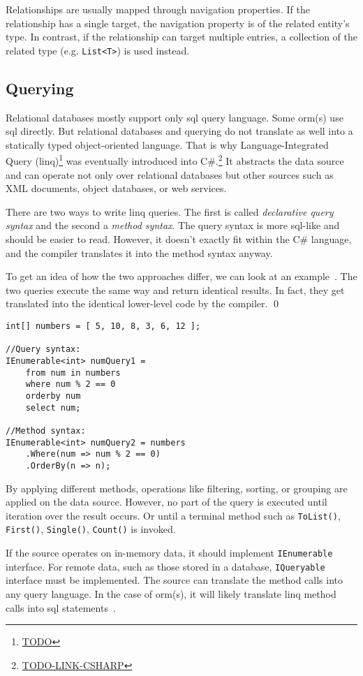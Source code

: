 Relationships are usually mapped through navigation properties. If the relationship has a single target, the navigation property is of the related entity's type. In contrast, if the relationship can target multiple entries, a collection of the related type (e.g. \texttt{List<T>}) is used instead.

\subsection{Querying}\label{sec:queries}
Relational databases mostly support only \acrshort{sql} query language. Some \acrshort{orm}(s) use \acrshort{sql} directly. But relational databases and querying do not translate as well into a statically typed object-oriented language. That is why Language-Integrated Query (\acrshort{linq})\footnote{\url{TODO}} was eventually introduced into C\#.\footnote{\url{TODO-LINK-CSHARP}} It abstracts the data source and can operate not only over relational databases but other sources such as XML documents, object databases, or web services.%

There are two ways to write \acrshort{linq} queries. The first is called \textit{declarative query syntax} and the second a \textit{method syntax}. The query syntax is more \acrshort{sql}-like and should be easier to read. However, it doesn't exactly fit within the C\# language, and the compiler translates it into the method syntax anyway.

\begin{example}
\small
To get an idea of how the two approaches differ, we can look at an example~\cite{linqQueries}. The two queries execute the same way and return identical results. In fact, they get translated into the identical lower-level code by the compiler.
\qed

\begin{lstlisting}[language=CSharp]
int[] numbers = [ 5, 10, 8, 3, 6, 12 ];

//Query syntax:
IEnumerable<int> numQuery1 =
    from num in numbers
    where num % 2 == 0
    orderby num
    select num;

//Method syntax:
IEnumerable<int> numQuery2 = numbers
    .Where(num => num % 2 == 0)
    .OrderBy(n => n);
\end{lstlisting}
\end{example}

By applying different methods, operations like filtering, sorting, or grouping are applied on the data source. However, no part of the query is executed until iteration over the result occurs. Or until a terminal method such as \texttt{ToList()}, \texttt{First()}, \texttt{Single()}, \texttt{Count()} is invoked. 

If the source operates on in-memory data, it should implement \texttt{IEnumerable} interface. For remote data, such as those stored in a database, \texttt{IQueryable} interface must be implemented. The source can translate the method calls into any query language. In the case of \acrshort{orm}(s), it will likely translate \acrshort{linq} method calls into \acrshort{sql} statements~\cite{linq}.
